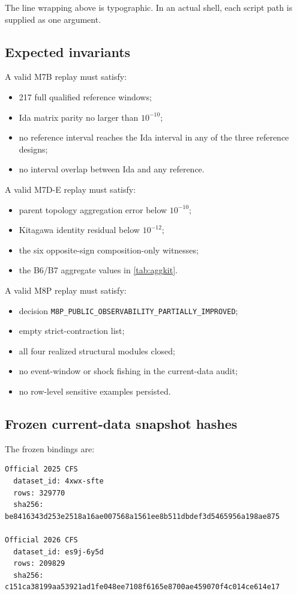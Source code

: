 \documentclass[11pt]{article}
\begin{document}
The line wrapping above is typographic. In an actual shell, each script path is supplied as one argument.

\subsection{Expected invariants}

A valid M7B replay must satisfy:
\begin{itemize}
\item 217 full qualified reference windows;
\item Ida matrix parity no larger than $10^{-10}$;
\item no reference interval reaches the Ida interval in any of the three reference designs;
\item no interval overlap between Ida and any reference.
\end{itemize}

A valid M7D-E replay must satisfy:
\begin{itemize}
\item parent topology aggregation error below $10^{-10}$;
\item Kitagawa identity residual below $10^{-12}$;
\item the six opposite-sign composition-only witnesses;
\item the B6/B7 aggregate values in \cref{tab:aggkit}.
\end{itemize}

A valid M8P replay must satisfy:
\begin{itemize}
\item decision \texttt{M8P\_PUBLIC\_OBSERVABILITY\_PARTIALLY\_IMPROVED};
\item empty strict-contraction list;
\item all four realized structural modules closed;
\item no event-window or shock fishing in the current-data audit;
\item no row-level sensitive examples persisted.
\end{itemize}

\subsection{Frozen current-data snapshot hashes}

The frozen bindings are:
\begin{lstlisting}
Official 2025 CFS
  dataset_id: 4xwx-sfte
  rows: 329770
  sha256: be8416343d253e2518a16ae007568a1561ee8b511dbdef3d5465956a198ae875

Official 2026 CFS
  dataset_id: es9j-6y5d
  rows: 209829
  sha256: c151ca38199aa53921ad1fe048ee7108f6165e8700ae459070f4c014ce614e17
\end{lstlisting}
\end{document}
